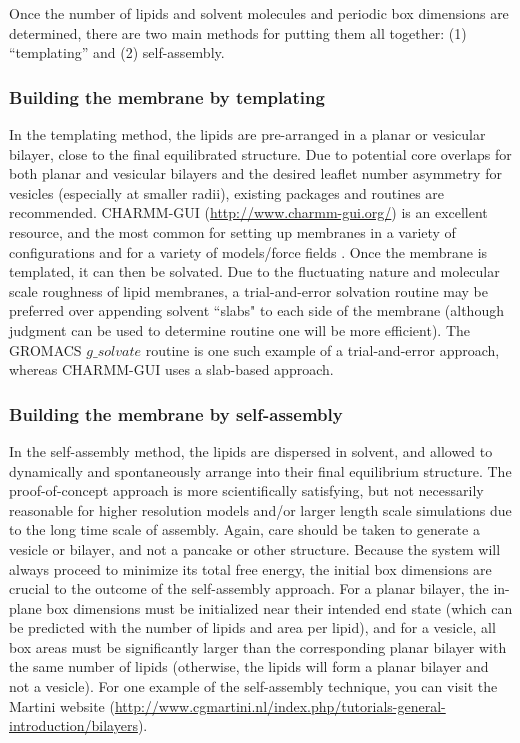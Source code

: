 \documentclass[9pt,bestpractices]{livecoms}
\begin{document}
Once the number of lipids and solvent molecules and periodic box dimensions are determined, there are two main methods for putting them all together: (1) ``templating'' and (2) self-assembly.

\subsubsection{Building the membrane by templating}
\label{subsubsec:templating}
In the templating method, the lipids are pre-arranged in a planar or vesicular bilayer, close to the final equilibrated structure.
Due to potential core overlaps for both planar and vesicular bilayers and the desired leaflet number asymmetry for vesicles (especially at smaller radii), existing packages and routines are recommended.
CHARMM-GUI (\url{http://www.charmm-gui.org/}) is an excellent resource, and the most common for setting up membranes in a variety of configurations and for a variety of models/force fields \cite{Jo2009,Cheng2013,Wu2014,Brooks2009}.
Once the membrane is templated, it can then be solvated.
Due to the fluctuating nature and molecular scale roughness of lipid membranes, a trial-and-error solvation routine may be preferred over appending solvent ``slabs" to each side of the membrane (although judgment can be used to determine routine one will be more efficient).
The GROMACS $g\_solvate$ routine is one such example of a trial-and-error approach, whereas CHARMM-GUI uses a slab-based approach.

\subsubsection{Building the membrane by self-assembly}
\label{subsubsec:selfassembly}
In the self-assembly method, the lipids are dispersed in solvent, and allowed to dynamically and spontaneously arrange into their final equilibrium structure.
The proof-of-concept approach is more scientifically satisfying, but not necessarily reasonable for higher resolution models and/or larger length scale simulations due to the long time scale of assembly.
Again, care should be taken to generate a vesicle or bilayer, and not a pancake or other structure.
Because the system will always proceed to minimize its total free energy, the initial box dimensions are crucial to the outcome of the self-assembly approach.
For a planar bilayer, the in-plane box dimensions must be initialized near their intended end state (which can be predicted with the number of lipids and area per lipid), and for a vesicle, all box areas must be significantly larger than the corresponding planar bilayer with the same number of lipids (otherwise, the lipids will form a planar bilayer and not a vesicle).
For one example of the self-assembly technique, you can visit the Martini website (\url{http://www.cgmartini.nl/index.php/tutorials-general-introduction/bilayers}).
\end{document}
